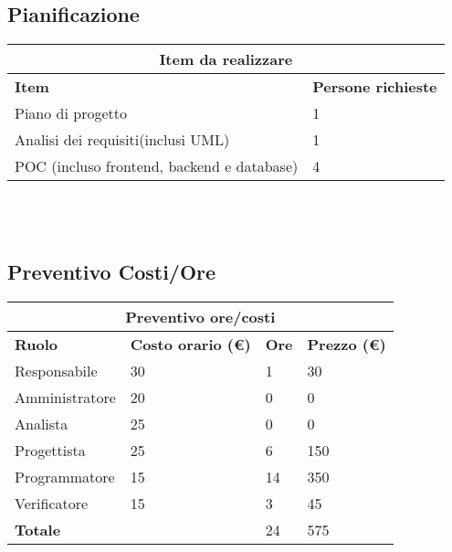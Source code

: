 \documentclass[12pt]{article}
\begin{document}
\subsection{Pianificazione}
\begin{center}
    \begin{tabularx}{\textwidth}{|X|X|}
        \hline
        \multicolumn{2}{|c|}{\textbf{Item da realizzare}}\\
        \hline
        \hline
        \textbf{Item} & \textbf{Persone richieste}\\
        \hline
        Piano di progetto & 1\\
        \hline
        Analisi dei requisiti(inclusi UML) & 1 \\
        \hline
        POC (incluso frontend, backend e database) & 4 \\
        \hline
    \end{tabularx}\\[8pt]
    \mbox{}\\
\end{center}
\subsection{Preventivo Costi/Ore}
\begin{center}
    \begin{tabularx}{\textwidth}{|X|X|X|X|}
        \hline
        \multicolumn{4}{|c|}{\textbf{Preventivo ore/costi}}\\
        \hline
        \hline
        \textbf{Ruolo} & \textbf{Costo orario (\euro)} & \textbf{Ore} & \textbf{Prezzo (\euro)}\\
        \hline
        Responsabile    & 30 & 1  & 30\\   
        \hline
        Amministratore  & 20 & 0  & 0\\ 
        \hline
        Analista        & 25 & 0  & 0\\ 
        \hline
        Progettista     & 25 & 6  & 150\\
        \hline
        Programmatore   & 15 & 14  & 350\\
        \hline
        Verificatore    & 15 & 3  & 45\\
        \hline
        \textbf{Totale} &    & 24 & 575\\
        \hline
    \end{tabularx}\\[8pt]
    \mbox{}\\
\end{center}
\end{document}
